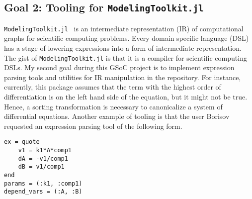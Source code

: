\documentclass[12pt,a4paper]{article}
\begin{document}
\subsection{Goal 2: Tooling for \texttt{ModelingToolkit.jl}}
\texttt{ModelingToolkit.jl}~\cite{modelingtoolkit} is an intermediate
representation (IR) of computational graphs for scientific computing problems.
Every domain specific language (DSL) has a stage of lowering expressions into a
form of intermediate representation. The gist of \texttt{ModelingToolkit.jl} is
that it is a compiler for scientific computing DSLs. My second goal during this
GSoC project is to implement expression parsing tools and utilities for IR
manipulation in the repository. For instance, currently, this package assumes
that the term with the highest order of differentiation is on the left hand
side of the equation, but it might not be true. Hence, a sorting transformation
is necessary to canonicalize a system of differential equations. Another
example of tooling is that the user Borisov~\cite{parsing} requested an
expression parsing tool of the following form.
\begin{lstlisting}
ex = quote
    v1 = k1*A*comp1
    dA = -v1/comp1
    dB = v1/comp1
end
params = (:k1, :comp1)
depend_vars = (:A, :B)
\end{lstlisting}
\end{document}
